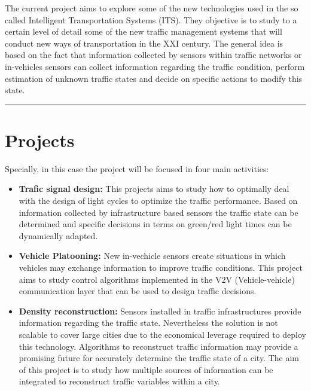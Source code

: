 \documentclass[]{book}
\providecommand{\tightlist}{%
  \setlength{\itemsep}{0pt}\setlength{\parskip}{0pt}}
\theoremstyle{definition}
\theoremstyle{definition}
\theoremstyle{definition}
\theoremstyle{remark}
\begin{document}
The current project aims to explore some of the new technologies used in
the so called Intelligent Transportation Systems (ITS). They objective
is to study to a certain level of detail some of the new traffic
management systems that will conduct new ways of transportation in the
XXI century. The general idea is based on the fact that information
collected by sensors within traffic networks or in-vehicles sensors can
collect information regarding the traffic condition, perform estimation
of unknown traffic states and decide on specific actions to modify this
state.

\begin{center}\rule{0.5\linewidth}{\linethickness}\end{center}

\hypertarget{projects}{%
\section*{Projects}\label{projects}}

Specially, in this case the project will be focused in four main
activities:

\begin{itemize}
\tightlist
\item
  \textbf{Trafic signal design:} This projects aims to study how to
  optimally deal with the design of light cycles to optimize the traffic
  performance. Based on information collected by infrastructure based
  sensors the traffic state can be determined and specific decisions in
  terms on green/red light times can be dynamically adapted.
\item
  \textbf{Vehicle Platooning:} New in-vechicle sensors create situations
  in which vehicles may exchange information to improve traffic
  conditions. This project aims to study control algorithms implemented
  in the V2V (Vehicle-vehicle) communication layer that can be used to
  design traffic decisions.
\item
  \textbf{Density reconstruction:} Sensors installed in traffic
  infrastructures provide information regarding the traffic state.
  Nevertheless the solution is not scalable to cover large cities due to
  the economical leverage required to deploy this technology. Algorithms
  to reconstruct traffic information may provide a promising future for
  accurately determine the traffic state of a city. The aim of this
  project is to study how multiple sources of information can be
  integrated to reconstruct traffic variables within a city.
\end{itemize}
\end{document}

